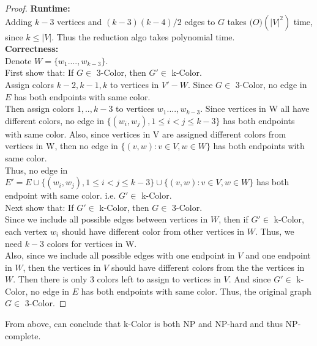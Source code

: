 \documentclass[11pt]{article}
\begin{document}
\begin{enumerate}
\begin{enumerate}
\begin{proof}
        \textbf{Runtime: }\\
            Adding $k-3$ vertices and $(k-3)(k-4)/2$ edges to $G$ takes $\mathcal(O)(|V|^2)$ time, since $k \leq |V|$. Thus the reduction algo takes polynomial time.\\
            
        \textbf{Correctness: }\\
            Denote $W =  \{w_1. ..., w_{k-3}\}$.\\
            First show that: If $G \in$ 3-Color, then $G' \in$ k-Color.\\ Assign colors $k-2, k-1, k$ to vertices in $V' - W$. Since $G \in$ 3-Color, no edge in $E$ has both endpoints with same color.\\
            Then assign colors $1,.., k-3$ to vertices  $w_1. ..., w_{k-3}$. Since vertices in W all have different colors, no edge in $\{(w_i, w_j), 1\leq i < j \leq k-3\}$ has both endpoints with same color. Also, since vertices in V are assigned different colors from vertices in W, then no edge in $\{(v, w): v\in V, w\in W\}$ has both endpoints with same color.\\
            Thus, no edge in $E' = E \cup \{(w_i, w_j), 1\leq i < j \leq k-3\} \cup \{(v, w): v\in V, w\in W\} $ has both endpoint with same color. i.e. $G' \in$ k-Color.\\[2ex]
            
            Next show that: If $G' \in$ k-Color, then $G \in$ 3-Color.\\
            Since we include all possible edges between vertices in $W$, then if $G'\in$ k-Color, each vertex $w_i$ should have different color from other vertices in $W$. Thus, we need $k-3$ colors for vertices in W.\\
            Also, since we include all possible edges with one endpoint in $V$ and one endpoint in $W$, then the vertices in $V$ should have different colors from the the vertices in $W$. Then there is only $3$ colors left to assign to vertices in $V$. And since $G' \in$ k-Color, no edge in $E$ has both endpoints with same color. Thus, the original graph $G \in$ 3-Color.
        \end{proof}
            From above, can conclude that k-Color is both NP and NP-hard and thus NP-complete.\\[2ex]
        
    \end{enumerate}
    

\end{enumerate}
\end{document}
